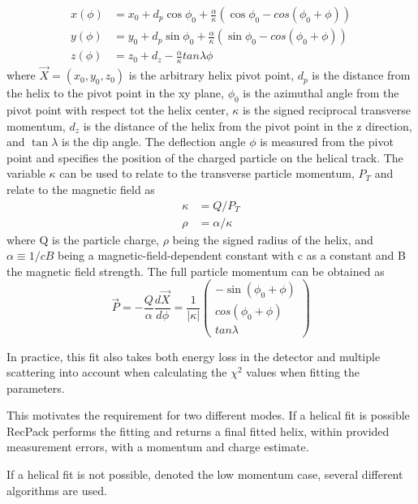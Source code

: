 \begin{align}
x(\phi) &= x_0 + d_p \cos \phi_0 + \frac{\alpha}{\kappa}(\cos \phi_0 - cos(\phi_0 + \phi))\\ 
y(\phi) &= y_0 + d_p \sin \phi_0 + \frac{\alpha}{\kappa}(\sin \phi_0 - cos(\phi_0 + \phi))\\
z(\phi) &= z_0 + d_z - \frac{\alpha}{\kappa} tan \lambda \phi
\end{align}
where $\vec{X} = (x_0, y_0, z_0)$ is the arbitrary helix pivot point, $d_p$ is the distance from the helix to the pivot point in the xy plane, $\phi_0$ is the azimuthal angle from the pivot point with respect tot the helix center, $\kappa$ is the signed reciprocal transverse momentum, $d_z$ is the distance of the helix from the pivot point in the z direction, and $\tan\lambda$ is the dip angle. The deflection angle $\phi$ is measured from the pivot point and specifies the position of the charged particle on the helical track. The variable $\kappa$ can be used to relate to the transverse particle momentum, $P_T$ and relate to the magnetic field as 
\begin{align}
 \kappa &=  Q/P_T \\  
 \rho &=  \alpha/\kappa
 \end{align}
where Q is the particle charge, $\rho$ being the signed radius of the helix, and $\alpha \equiv 1/c B$ being a magnetic-field-dependent constant with c as a constant and B the magnetic field strength. The full particle momentum can be obtained as 
\begin{equation}
\vec{P} = - \frac{Q}{\alpha} \frac{d\vec{X}}{d\phi} = \frac{1}{|\kappa |} 
 \begin{pmatrix}
 -\sin(\phi_0 + \phi)\\
 cos(\phi_0 + \phi)\\
 tan\lambda
 \end{pmatrix}
\end{equation}

In practice, this fit also takes both energy loss in the detector and multiple scattering into account when calculating the $\chi^2$ values when fitting the parameters. 

This motivates the requirement for two different modes. If a helical fit is possible RecPack performs the fitting and returns a final fitted helix, within provided measurement errors, with a momentum and charge estimate.

If a helical fit is not possible, denoted the low momentum case, several different algorithms are used.

